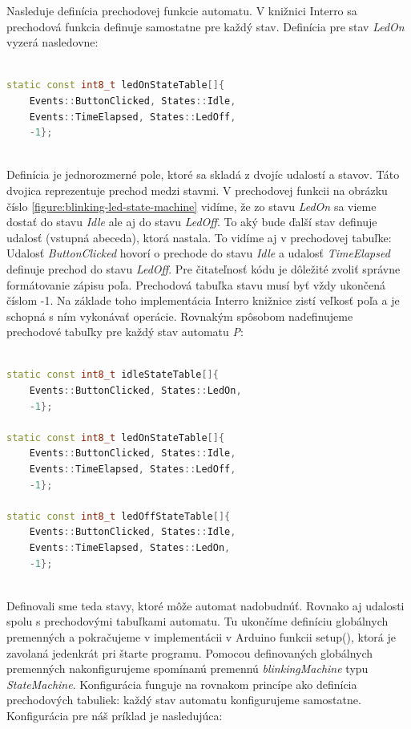 Nasleduje definícia prechodovej funkcie automatu. V knižnici Interro sa prechodová funkcia definuje samostatne pre každý stav.
Definícia pre stav \textit{LedOn} vyzerá nasledovne:

\begin{lstlisting}[language=c++]  

static const int8_t ledOnStateTable[]{
    Events::ButtonClicked, States::Idle,
    Events::TimeElapsed, States::LedOff,
    -1};
    
\end{lstlisting}

Definícia je jednorozmerné pole, ktoré sa skladá z dvojíc udalostí a stavov. Táto dvojica reprezentuje prechod medzi stavmi. V prechodovej funkcii na obrázku číslo
\ref{figure:blinking-led-state-machine} vidíme, že zo stavu \textit{LedOn} sa vieme dostať do stavu \textit{Idle} ale aj do stavu \textit{LedOff}.
To aký bude ďalší stav definuje udalosť (vstupná abeceda), ktorá nastala. To vidíme aj v prechodovej tabuľke: Udalosť \textit{ButtonClicked} hovorí o prechode do stavu
\textit{Idle} a udalosť \textit{TimeElapsed} definuje prechod do stavu \textit{LedOff}. Pre čitateľnosť kódu je dôležité zvoliť správne formátovanie zápisu poľa.
Prechodová tabuľka stavu musí byť vždy ukončená číslom -1. Na základe toho implementácia Interro knižnice zistí veľkosť poľa a je schopná s ním vykonávať operácie.
Rovnakým spôsobom nadefinujeme prechodové tabuľky pre každý stav automatu \textit{P}:

\begin{lstlisting}[language=c++]  

static const int8_t idleStateTable[]{
    Events::ButtonClicked, States::LedOn,
    -1};

static const int8_t ledOnStateTable[]{
    Events::ButtonClicked, States::Idle,
    Events::TimeElapsed, States::LedOff,
    -1};

static const int8_t ledOffStateTable[]{
    Events::ButtonClicked, States::Idle,
    Events::TimeElapsed, States::LedOn,
    -1};
    
\end{lstlisting}

Definovali sme teda stavy, ktoré môže automat nadobudnúť. Rovnako aj udalosti spolu s prechodovými tabuľkami automatu.
Tu ukončíme definíciu globálnych premenných a pokračujeme v implementácii v Arduino funkcii setup(), ktorá je zavolaná jedenkrát pri štarte programu.
Pomocou definovaných globálnych premenných nakonfigurujeme spomínanú premennú \textit{blinkingMachine} typu \textit{StateMachine}. Konfigurácia funguje
na rovnakom princípe ako definícia prechodových tabuliek: každý stav automatu konfigurujeme samostatne. Konfigurácia pre náš príklad je nasledujúca:

